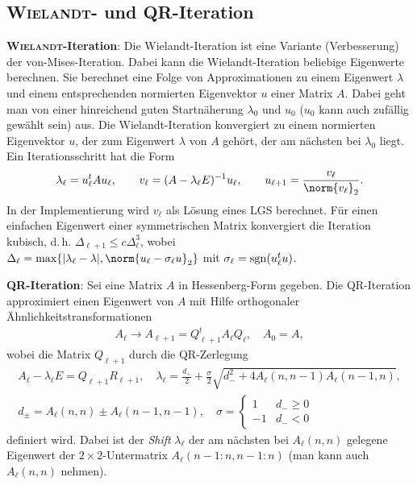 \subsection{%
    \textsc{Wielandt}- und QR-Iteration%
}

\textbf{\textsc{Wielandt}-Iteration}:
Die Wielandt-Iteration ist eine Variante (Verbesserung) der von-Mises-Iteration.
Dabei kann die Wielandt-Iteration beliebige Eigenwerte berechnen.
Sie berechnet eine Folge von Approximationen zu einem Eigenwert
$\lambda$ und einem entsprechenden normierten Eigenvektor $u$ einer Matrix $A$.
Dabei geht man von einer hinreichend guten Startnäherung $\lambda_0$ und $u_0$
($u_0$ kann auch zufällig gewählt sein) aus.
Die Wielandt-Iteration konvergiert zu einem normierten Eigenvektor $u$,
der zum Eigenwert $\lambda$ von $A$ gehört, der am nächsten bei $\lambda_0$
liegt. \\
Ein Iterationsschritt hat die Form
\begin{align*}
    \lambda_\ell = u_\ell^t A u_\ell, \qquad
    v_\ell = (A - \lambda_\ell E)^{-1} u_\ell, \qquad
    u_{\ell + 1} = \frac{v_\ell}{\norm{v_\ell}_2}.
\end{align*}
In der Implementierung wird $v_\ell$ als Lösung eines LGS berechnet.
Für einen einfachen Eigenwert einer symmetrischen Matrix konvergiert die
Iteration kubisch, d.\,h. $\Delta_{\ell+1} \le c \Delta_\ell^3$, wobei \\
$\Delta_\ell = \max\{|\lambda_\ell - \lambda|,
\norm{u_\ell - \sigma_\ell u}_2\}$
mit $\sigma_\ell = \operatorname{sgn}(u_\ell^t u)$.

\linie

\textbf{QR-Iteration}:
Sei eine Matrix $A$ in Hessenberg-Form gegeben.
Die QR-Iteration approximiert einen Eigenwert von $A$ mit Hilfe orthogonaler
Ähnlichkeitstransformationen
\begin{align*}
    A_\ell \rightarrow A_{\ell+1} = Q_{\ell+1}^t A_\ell Q_\ell, \quad
    A_0 = A,
\end{align*}
wobei die Matrix $Q_{\ell+1}$ durch die QR-Zerlegung
\[\begin{array}{c}
    A_\ell - \lambda_\ell E = Q_{\ell+1} R_{\ell+1}, \quad
    \lambda_\ell = \frac{d_+}{2} + \frac{\sigma}{2}
    \sqrt{d_-^2 + 4 A_\ell(n, n - 1) A_\ell(n - 1, n)},\\
    d_\pm = A_\ell(n, n) \pm A_\ell(n - 1, n - 1), \quad
    \sigma = \begin{cases}1 & d_- \ge 0 \\ -1 & d_- < 0\end{cases}
\end{array}\]
definiert wird.
Dabei ist der \emph{Shift} $\lambda_\ell$ der am nächsten bei
$A_\ell(n, n)$ gelegene Eigenwert der $2 \times 2$-Untermatrix
$A_\ell(n - 1:n, n - 1:n)$ (man kann auch $A_\ell(n, n)$ nehmen).

